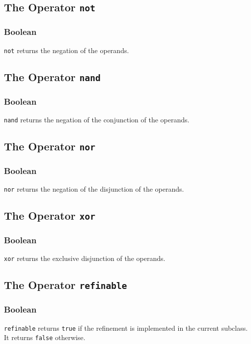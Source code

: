 \subsection{The Operator {\tt not}}
\subsubsection{Boolean}
\verb!not! returns the negation of the operands.

\subsection{The Operator {\tt nand}}
\subsubsection{Boolean}
\verb!nand! returns the negation of the conjunction of the operands.

\subsection{The Operator {\tt nor}}
\subsubsection{Boolean}
\verb!nor! returns the negation of the disjunction of the operands.

\subsection{The Operator {\tt xor}}
\subsubsection{Boolean}
\verb!xor! returns the exclusive disjunction of the operands.

\subsection{The Operator {\tt refinable}}
\subsubsection{Boolean}
\verb!refinable! returns \verb!true! if the refinement is implemented in the current subclass. It returns \verb!false! otherwise.